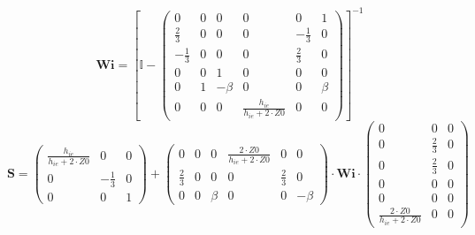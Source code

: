 \[ \mathbf{Wi} =  \left[ \mathbb{I}  - \left(\begin{smallmatrix} 0 & 0
& 0 & 0 & 0 & 1 \\ \frac{2}{3} & 0 & 0 & 0 & -\frac{1}{3} & 0 \\
-\frac{1}{3} & 0 & 0 & 0 & \frac{2}{3} & 0 \\ 0 & 0 & 1 & 0 & 0 & 0 \\
0 & 1 & -\beta & 0 & 0 & \beta \\ 0 & 0 & 0 &
\frac{h_{ie}}{h_{ie}+2\cdot Z0} & 0 & 0 \end{smallmatrix}\right)
\right]^{-1}  \]
\[ \mathbf{S} = \left(\begin{smallmatrix} \frac{h_{ie}}{h_{ie}+2\cdot
Z0} & 0 & 0 \\ 0 & -\frac{1}{3} & 0 \\ 0 & 0 & 1
\end{smallmatrix}\right) + \left(\begin{smallmatrix} 0 & 0 & 0 &
\frac{2\cdot Z0}{h_{ie}+2\cdot Z0} & 0 & 0 \\ \frac{2}{3} & 0 & 0 & 0
& \frac{2}{3} & 0 \\ 0 & 0 & \beta & 0 & 0 & -\beta
\end{smallmatrix}\right) \cdot \mathbf{Wi}
\cdot\left(\begin{smallmatrix} 0 & 0 & 0 \\ 0 & \frac{2}{3} & 0 \\ 0 &
\frac{2}{3} & 0 \\ 0 & 0 & 0 \\ 0 & 0 & 0 \\ \frac{2\cdot
Z0}{h_{ie}+2\cdot Z0} & 0 & 0 \end{smallmatrix}\right) \]
